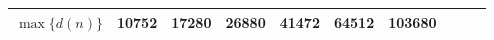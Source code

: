 \begin{table}[H]
\begin{tabular}{|c|c|c|c|c|c|c|c|c|c|}
			\hline
			$\max\{d(n)\}$ & 10752 & 17280 & 26880 & 41472 & 64512 & 103680\\
			\hline
			\end{tabular}
\begin{comment}
		\begin{tabular}{|r|r|r|r|}
			\hline
			n  & LCM(1...n)  & Pn  & Bn \\
			\hline
			2  & 2  & 2  & 2 \\
			\hline
			3  & 6  & 3  & 5 \\
			\hline
			4  & 12  & 5  & 15 \\
			\hline
			5  & 60  & 7  & 52 \\
			\hline
			6  & 60  & 11  & 203 \\
			\hline
			7  & 420  & 15  & 877 \\
			\hline
			8  & 840  & 22  & 4140 \\
			\hline
			9  & 2520  & 30  & 21147 \\
			\hline
			10  & 2520  & 42  & 115975 \\
			\hline
			11  & 27720  & 56  & 678570 \\
			\hline
			12  & 27720  & 77  & 4213597 \\
			\hline
			15  & 360360  & 176  & 1382958545 \\
			\hline
			20  & 232792560  & 627  &  \\
			\hline
			25  &   & 1958  &  \\
			\hline
			30  &   & 5604  &  \\
			\hline
			40  &   & 37338  &  \\
			\hline
			50  &   & 204226  &  \\
			\hline
			70  &   & 4087968  &  \\
			\hline
			100  &   & 190569292  &  \\
			\hline
		\end{tabular}
\end{comment}
	\end{table}